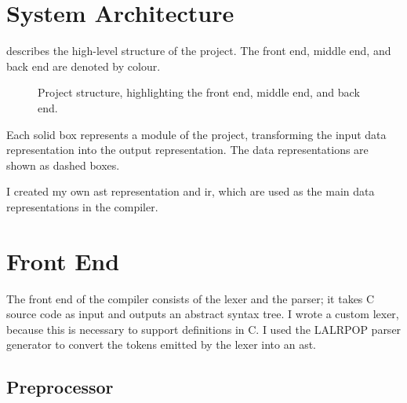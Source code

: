 \documentclass[00-main.tex]{subfiles}
\begin{document}
\section{System Architecture}

 describes the high-level structure of the project. The \textcolor{frontendcolor}{front end}, \textcolor{middleendcolor}{middle end}, and \textcolor{backendcolor}{back end} are denoted by colour.

\begin{figure}[!ht]
  \centering
  \caption{Project structure, highlighting the \textcolor{frontendcolor}{front end}, \textcolor{middleendcolor}{middle end}, and \textcolor{backendcolor}{back end}.}
  \label{fig:project flowchart} %
\end{figure}

Each solid box represents a module of the project, transforming the input data representation into the output representation.
The data representations are shown as dashed boxes.

I created my own \gls{ast} representation and \gls{ir}, which are used as the main data representations in the compiler.


\section{Front End}


The front end of the compiler consists of the lexer and the parser; it takes C source code as input and outputs an abstract syntax tree.
I wrote a custom lexer, because this is necessary to support  definitions in C\@.
I used the LALRPOP parser generator  to convert the tokens emitted by the lexer into an \gls{ast}\@.

\subsection{Preprocessor}
\end{document}
